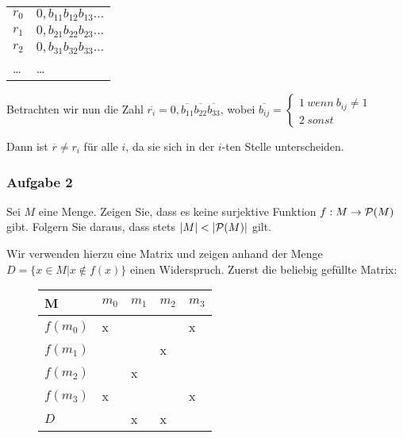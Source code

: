 \begin{enumerate}
            \begin{tabular}{|l|l|}
                \hline
                $r_{0}$ & $0,b_{11}b_{12}b_{13}\dots$ \\
                $r_{1}$ & $0,b_{21}b_{22}b_{23}\dots$ \\
                $r_{2}$ & $0,b_{31}b_{32}b_{33}\dots$ \\
                \dots & \dots \\
                \hline
            \end{tabular}

            Betrachten wir nun die Zahl $\overline{r_{i}} = 0,\overline{b_{11}}\overline{b_{22}}\overline{b_{33}}$, wobei $\overline{b_{ij}} =
            \begin{cases}
                1\ wenn\ b_{ij} \neq 1 \\
                2\ sonst
            \end{cases}
            $

            Dann ist $\overline{r} \neq r_{i}$ für alle $i$, da sie sich in der $i$-ten Stelle unterscheiden.
    \end{enumerate}

\subsubsection*{Aufgabe 2}
    Sei $M$ eine Menge. Zeigen Sie, dass es keine surjektive Funktion $f: M \to \mathcal{P}(M)$ gibt. Folgern Sie daraus, dass stets $|M| < |\mathcal{P}(M)|$ gilt.

    \LOES Wir verwenden hierzu eine Matrix und zeigen anhand der Menge $D = \{x \in M | x \not\in f(x) \}$ einen Widerspruch. Zuerst die beliebig gefüllte Matrix: \\

        \begin{figure}[h]
            \centering{}
            \begin{tabular}{l|llll}
                M & $m_{0}$ & $m_{1}$ & $m_{2}$ & $m_{3}$ \\
                \hline
                $f(m_{0})$ & \cellcolor{light-red} x & & & x \\
                $f(m_{1})$ & & \cellcolor{light-red} & x & \\
                $f(m_{2})$ & & x & \cellcolor{light-red} & \\
                $f(m_{3})$ & x & & & \cellcolor{light-red} x \\
                \hline
                $D$ & & x & x & \\
                \hline
            \end{tabular}
        \end{figure}

